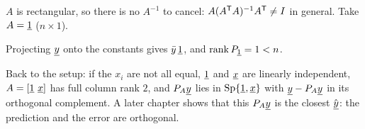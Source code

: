 \begin{example}
$A$ is rectangular, so there is no $A^{-1}$ to cancel: $A(A^{\mathsf{T}} A)^{-1}A^{\mathsf{T}}\ne I$ in general. Take $A=\underline{1}$ ($n\times1$).
\begin{deriv}
\end{deriv}
Projecting $\underline{y}$ onto the constants gives $\bar y\,\underline{1}$, and $\operatorname{rank} P_{\underline{1}}=1<n$.
\end{example}

Back to the setup: if the $x_i$ are not all equal, $\underline{1}$ and $\underline{x}$ are linearly independent, $A=[\underline{1}\ \underline{x}]$ has full column rank $2$, and $P_A\underline{y}$ lies in $\operatorname{Sp}\{\underline{1},\underline{x}\}$ with $\underline{y}-P_A\underline{y}$ in its orthogonal complement. A later chapter shows that this $P_A\underline{y}$ is the closest $\hat{\underline{y}}$: the prediction and the error are orthogonal.

